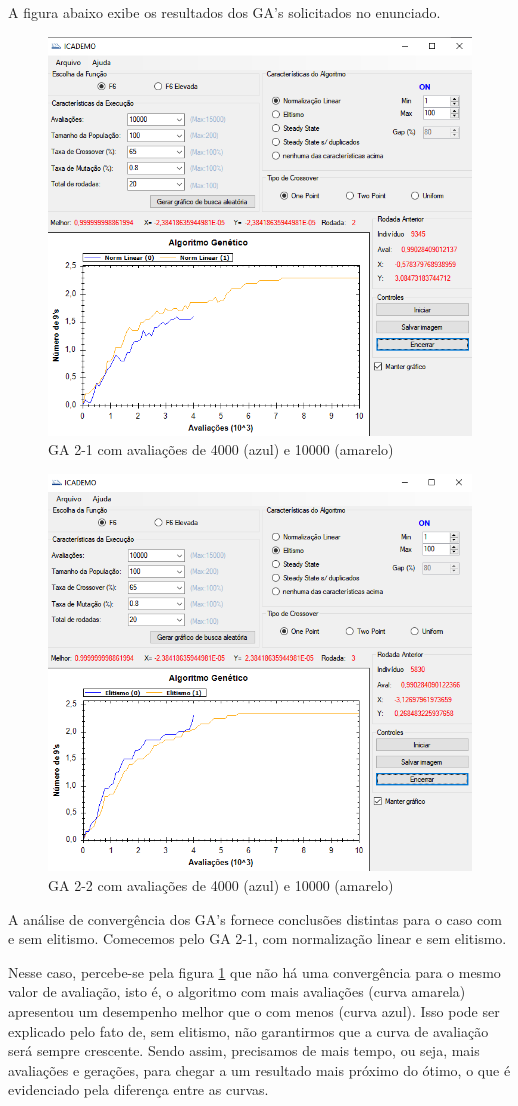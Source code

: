 \documentclass[12pt]{article}
\begin{document}
A figura abaixo exibe os resultados dos GA's solicitados no enunciado.

\begin{figure}[H]
	\centering
	\includegraphics[width=0.7\linewidth]{Imagens/questao5_1}
	\caption{GA 2-1 com avaliações de 4000 (azul) e 10000 (amarelo)}
	\label{fig:questao51}
\end{figure}

\begin{figure}[H]
	\centering
	\includegraphics[width=0.7\linewidth]{Imagens/questao5_2}
	\caption{GA 2-2 com avaliações de 4000 (azul) e 10000 (amarelo)}
	\label{fig:questao52}
\end{figure}

A análise de convergência dos GA's fornece conclusões distintas para o caso com e sem elitismo. Comecemos pelo GA 2-1, com normalização linear e sem elitismo.

Nesse caso, percebe-se pela figura \ref{fig:questao51} que não há uma convergência para o mesmo valor de avaliação, isto é, o algoritmo com mais avaliações (curva amarela) apresentou um desempenho melhor que o com menos (curva azul). Isso pode ser explicado pelo fato de, sem elitismo, não garantirmos que a curva de avaliação será sempre crescente. Sendo assim, precisamos de mais tempo, ou seja, mais avaliações e gerações, para chegar a um resultado mais próximo do ótimo, o que é evidenciado pela diferença entre as curvas.
\end{document}
